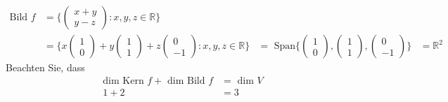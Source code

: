 \documentclass[11pt]{report}
\newcommand*\Zb[1] {\mathbb{#1}}
\begin{document}
\begin{align}
 \text{Bild }f &= \{\begin{pmatrix} x + y \\ y - z\end{pmatrix}: x, y, z \in \Zb{R}\} \\
&= \{x \begin{pmatrix} 1 \\ 0\end{pmatrix} + y \begin{pmatrix}1\\1 \end{pmatrix} + z \begin{pmatrix} 0 \\ -1 \end{pmatrix}: x,y,z\in \Zb{R}\}
&= \text{ Span}\{\begin{pmatrix} 1\\0\end{pmatrix}, \begin{pmatrix} 1\\1\end{pmatrix}, \begin{pmatrix} 0 \\-1 \end{pmatrix}\}
&= \Zb{R}^2
\end{align}
Beachten Sie, dass
\begin{align}
 \text{dim Kern }f + \text{ dim Bild }f &= \text{ dim } V \\
1 + 2 &= 3
\end{align}
\end{document}
